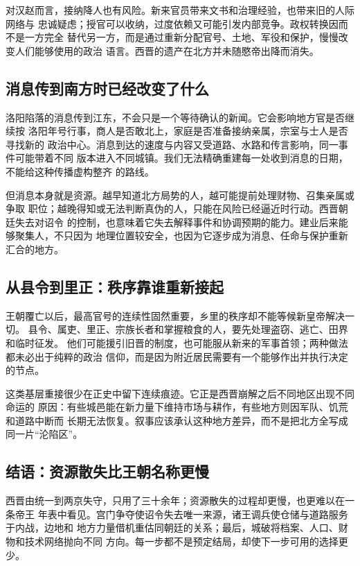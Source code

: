 对汉赵而言，接纳降人也有风险。新来官员带来文书和治理经验，也带来旧的人际网络与
忠诚疑虑；授官可以收纳，过度依赖又可能引发内部竞争。政权转换因而不是一方完全
替代另一方，而是通过重新分配官号、土地、军役和保护，慢慢改变人们能够使用的政治
语言。西晋的遗产在北方并未随愍帝出降而消失。

\subsection{消息传到南方时已经改变了什么}

洛阳陷落的消息传到江东，不会只是一个等待确认的新闻。它会影响地方官是否继续按
洛阳年号行事，商人是否敢北上，家庭是否准备接纳亲属，宗室与士人是否寻找新的
政治中心。消息到达的速度与内容又受道路、水路和传言影响，同一事件可能带着不同
版本进入不同城镇。我们无法精确重建每一处收到消息的日期，不能给这种传播虚构整齐
的路线。

但消息本身就是资源。越早知道北方局势的人，越可能提前处理财物、召集亲属或争取
职位；越晚得知或无法判断真伪的人，只能在风险已经逼近时行动。西晋朝廷失去对诏令
的控制，也意味着它失去解释事件和协调预期的能力。建业后来能够聚集人，不只因为
地理位置较安全，也因为它逐步成为消息、任命与保护重新汇合的地方。

\subsection{从县令到里正：秩序靠谁重新接起}

王朝覆亡以后，最高官号的连续性固然重要，乡里的秩序却不能等候新皇帝解决一切。
县令、属吏、里正、宗族长者和掌握粮食的人，要先处理盗窃、逃亡、田界和临时征发。
他们可能援引旧晋的制度，也可能服从新来的军事首领；两种做法都未必出于纯粹的政治
信仰，而是因为附近居民需要有一个能够作出并执行决定的节点。

这类基层重接很少在正史中留下连续痕迹。它正是西晋崩解之后不同地区出现不同命运的
原因：有些城邑能在新力量下维持市场与耕作，有些地方则因军队、饥荒和道路中断而
长期无法恢复。叙事应该承认这种地方差异，而不是把北方全写成同一片“沦陷区”。

\subsection{结语：资源散失比王朝名称更慢}

西晋由统一到两京失守，只用了三十余年；资源散失的过程却更慢，也更难以在一条帝王
年表中看见。宫门争夺使诏令失去唯一来源，诸王调兵使仓储与道路服务于内战，边地和
地方力量借机重估同朝廷的关系；最后，城破将档案、人口、财物和技术网络抛向不同
方向。每一步都不是预定结局，却使下一步可用的选择更少。

